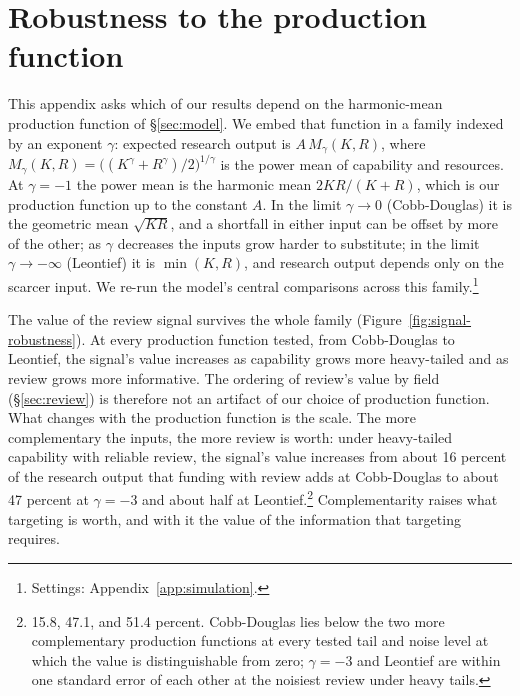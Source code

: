 \section{Robustness to the production function}\label{app:technology}

This appendix asks which of our results depend on the harmonic-mean production function of \S\ref{sec:model}. We embed that function in a family indexed by an exponent $\gamma$: expected research output is $A\,M_\gamma(K, R)$, where $M_\gamma(K, R) = \big((K^{\gamma} + R^{\gamma})/2\big)^{1/\gamma}$ is the power mean of capability and resources. At $\gamma = -1$ the power mean is the harmonic mean $2KR/(K + R)$, which is our production function up to the constant $A$. In the limit $\gamma \to 0$ (Cobb-Douglas) it is the geometric mean $\sqrt{KR}$, and a shortfall in either input can be offset by more of the other; as $\gamma$ decreases the inputs grow harder to substitute; in the limit $\gamma \to -\infty$ (Leontief) it is $\min(K, R)$, and research output depends only on the scarcer input. We re-run the model's central comparisons across this family.\footnote{Settings: Appendix~\ref{app:simulation}.}

The value of the review signal survives the whole family (Figure~\ref{fig:signal-robustness}). At every production function tested, from Cobb-Douglas to Leontief, the signal's value increases as capability grows more heavy-tailed and as review grows more informative. The ordering of review's value by field (\S\ref{sec:review}) is therefore not an artifact of our choice of production function. What changes with the production function is the scale. The more complementary the inputs, the more review is worth: under heavy-tailed capability with reliable review, the signal's value increases from about 16 percent of the research output that funding with review adds at Cobb-Douglas to about 47 percent at $\gamma = -3$ and about half at Leontief.\footnote{15.8, 47.1, and 51.4 percent. Cobb-Douglas lies below the two more complementary production functions at every tested tail and noise level at which the value is distinguishable from zero; $\gamma = -3$ and Leontief are within one standard error of each other at the noisiest review under heavy tails.} Complementarity raises what targeting is worth, and with it the value of the information that targeting requires.

